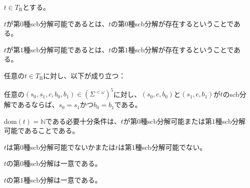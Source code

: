 \documentclass[dvipdfmx,uplatex]{jsarticle}
\theoremstyle{customnonumberbreakfortheorem}
\theoremstyle{customnonumberbreakforproof}
\begin{document}
\(t \in T_{\textrm{B}}\)とする。
\begin{nenumerate}
	\item \(t\)が第\(0\)種scb分解可能であるとは、\(t\)の第\(0\)種scb分解が存在するということである。
	\item \(t\)が第\(1\)種scb分解可能であるとは、\(t\)の第\(1\)種scb分解が存在するということである。
\end{nenumerate}

\begin{proposition}[scb分解の一意性]\label{scb分解の一意性}
	任意の\(t \in T_{\textrm{B}}\)に対し、以下が成り立つ：
	\begin{penumerate}
		\item 任意の\((s_0,s_1,c,b_0,b_1) \in (\Sigma^{< \omega})^5\)に対し、\((s_0,c,b_0)\)と\((s_1,c,b_1)\)が\(t\)のscb分解であるならば、\(s_0 = s_1\)かつ\(b_0 = b_1\)である。
		\item \(\textrm{dom}(t) = \mathbb{N}\)である必要十分条件は、\(t\)が第\(0\)種scb分解可能または第\(1\)種scb分解可能であることである。
		\item \(t\)は第\(0\)種scb分解可能でないかまたは\(t\)は第\(1\)種scb分解可能でない。
		\item \(t\)の第\(0\)種scb分解は一意である。
		\item \(t\)の第\(1\)種scb分解は一意である。
	\end{penumerate}
\end{proposition}
\end{document}
